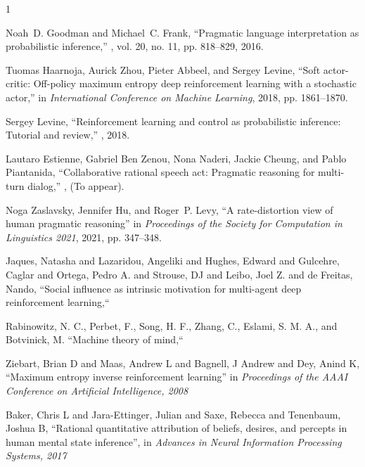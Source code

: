 \documentclass{article}
\begin{document}
\begin{thebibliography}{1}

Noah~D. Goodman and Michael~C. Frank,
\newblock ``Pragmatic language interpretation as probabilistic inference,''
, vol. 20, no. 11, pp. 818--829,
  2016.

Tuomas Haarnoja, Aurick Zhou, Pieter Abbeel, and Sergey Levine,
\newblock ``Soft actor-critic: Off-policy maximum entropy deep reinforcement
  learning with a stochastic actor,''
\newblock in {\em International Conference on Machine Learning}, 2018, pp.
  1861--1870.

Sergey Levine,
\newblock ``Reinforcement learning and control as probabilistic inference:
  Tutorial and review,''
, 2018.

Lautaro Estienne, Gabriel Ben Zenou, Nona Naderi, Jackie Cheung, and Pablo
  Piantanida,
\newblock ``Collaborative rational speech act: Pragmatic reasoning for
  multi-turn dialog,''
,
\newblock (To appear).

Noga Zaslavsky, Jennifer Hu, and Roger~P. Levy,
\newblock ``A rate-distortion view of human pragmatic reasoning''
\newblock in {\em Proceedings of the Society for Computation in Linguistics
  2021}, 2021, pp. 347--348.

Jaques, Natasha and Lazaridou, Angeliki and Hughes, Edward and Gulcehre, Caglar and Ortega, Pedro A. and Strouse, DJ and Leibo, Joel Z. and de Freitas, Nando, 
\newblock ``Social influence as intrinsic motivation for multi-agent deep reinforcement learning,``

Rabinowitz, N. C., Perbet, F., Song, H. F., Zhang, C., Eslami, S. M. A., and Botvinick, M. 
\newblock ``Machine theory of mind,``

Ziebart, Brian D and Maas, Andrew L and Bagnell, J Andrew and Dey, Anind K,
\newblock ``Maximum entropy inverse reinforcement learning''
\newblock in {\em Proceedings of the AAAI Conference on Artificial Intelligence, 2008}

Baker, Chris L and Jara-Ettinger, Julian and Saxe, Rebecca and Tenenbaum, Joshua B,
\newblock ``Rational quantitative attribution of beliefs, desires, and percepts in human mental state inference'',
\newblock in {\em Advances in Neural Information Processing Systems, 2017}


\end{thebibliography}
\end{document}
